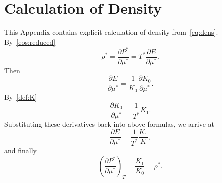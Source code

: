 \documentclass[12pt]{article}
\numberwithin{equation}{section}
\begin{document}
	\pagebreak	
		
	\section{\label{sec:app:dens} Calculation of Density}
	This Appendix contains explicit calculation of density from~\eqref{eq:dens}. By~\eqref{eos:reduced}
	\begin{equation}
		\rho^* = \frac{\partial P^*}{\partial \mu^*} = T^* \frac{\partial E}{\partial \mu^*}.
	\end{equation}
	Then
	\begin{equation}
		\frac{\partial E}{\partial \mu^*} = \frac{1}{K_0} \frac{\partial K_0}{\partial \mu^*}.
	\end{equation}
	By~\eqref{def:K}
	\begin{equation}
		\frac{\partial K_0}{\partial \mu^*} = \frac{1}{T^*}K_1.
	\end{equation}
	Substituting these derivatives back into above formulas, we arrive at
	\begin{equation}
		\frac{\partial E}{\partial \mu^*} = \frac{1}{T^*} \frac{K_1}{K},
	\end{equation}
	and finally
	\begin{equation}
		\left(\frac{\partial P^*}{\partial \mu^*} \right)_T = \frac{K_1}{K_0} = \rho^*.
	\end{equation}
	
	
\end{document}
